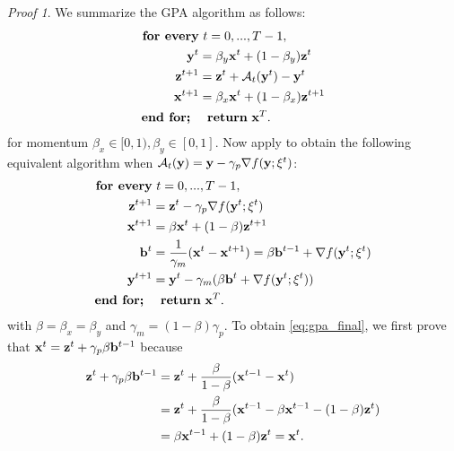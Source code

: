 \documentclass{article}
\theoremstyle{plain}
\theoremstyle{definition}
\theoremstyle{remark}
\newtheorem{prooft}{Proof}
\def\bx{\mathbf{x}}
\begin{document}
\begin{prooft} \label{proof:gpa_reduction}
We summarize the GPA algorithm as follows:
\begin{equation} 
    \begin{aligned}
    \textbf{for every}&~ t=0, ..., T-1,\\
        {\bf y}^{t} &= \beta_y {\bf x}^t + ( 1 -\beta_y) {\bf z}^t \\
        {\bf z}^{t+1} &= {\bf z}^t + {\cal A}_t({\bf y}^t) - {\bf y}^t \\
        {\bf x}^{t+1} &= \beta_x {\bf x}^t + ( 1 - \beta_x) {\bf z}^{t+1} \\
    \textbf{end for;}~~&~~\textbf{return}~\bx^T.
    \end{aligned}
\end{equation}
for momentum $\beta_x \in  [0, 1), \beta_y \in [0, 1]$. 
Now apply \cite[Proposition 1]{defazio2025smoothing} to obtain the following equivalent algorithm when ${\cal A}_t({\bf y}) = {\bf y} - \gamma_p \nabla f({\bf y}; \xi^t)$:
\begin{equation} 
    \begin{aligned}
    \textbf{for every}&~ t=0, ..., T-1,\\
        {\bf z}^{t+1} &= {\bf z}^t - \gamma_p \nabla f({\bf y}^t; \xi^t) \\
        {\bf x}^{t+1} &= \beta {\bf x}^t + ( 1 - \beta) {\bf z}^{t+1} \\
        {\bf b}^{t} &= \frac{1}{\gamma_m} ({\bf x}^t - {\bf x}^{t+1}) = \beta {\bf b}^{t-1} + \nabla f({\bf y}^t; \xi^t) \\
        {\bf y}^{t+1} &= {\bf y}^{t} - \gamma_m (\beta {\bf b}^t + \nabla f({\bf y}^t; \xi^t))\\
    \textbf{end for;}~~&~~\textbf{return}~\bx^T.
    \end{aligned}
\end{equation}
with $\beta = \beta_x = \beta_y$ and $\gamma_m = (1 - \beta)\gamma_p$. To obtain \eqref{eq:gpa_final}, we first prove that ${\bf x}^t = {\bf z}^t +\gamma_p  \beta {\bf b}^{t-1}$ because
\begin{align}
    {\bf z}^t +\gamma_p  \beta {\bf b}^{t-1} &= {\bf z}^t + \frac{\beta}{1 - \beta} ({\bf x}^{t-1} - {\bf x}^t)\\
    &={\bf z}^t + \frac{\beta}{1 - \beta} ({\bf x}^{t-1} - \beta {\bf x}^{t-1} - (1 - \beta){\bf z}^t) \\
     &=\beta {\bf x}^{t-1} + (1 - \beta) {\bf z}^t = {\bf x}^t.
\end{align}

\end{prooft}
\end{document}
